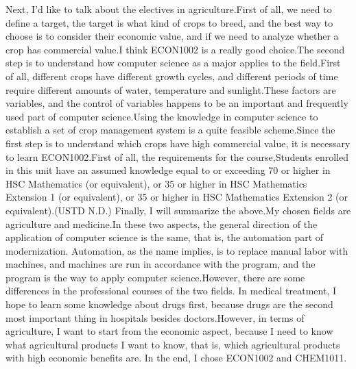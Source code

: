 \documentclass[12pt]{article}
\begin{document}
Next, I'd like to talk about the electives in agriculture.First of all, we need to define a target, the target is what kind of crops to breed, and the best way to choose is to consider their economic value, and if we need to analyze whether a crop has commercial value.I think ECON1002 is a really good choice.The second step is to understand how computer science as a major applies to the field.First of all, different crops have different growth cycles, and different periods of time require different amounts of water, temperature and sunlight.These factors are variables, and the control of variables happens to be an important and frequently used part of computer science.Using the knowledge in computer science to establish a set of crop management system is a quite feasible scheme.Since the first step is to understand which crops have high commercial value, it is necessary to learn ECON1002.First of all, the requirements for the course,Students enrolled in this unit have an assumed knowledge equal to or exceeding 70 or higher in HSC Mathematics (or equivalent), or 35 or higher in HSC Mathematics Extension 1 (or equivalent), or 35 or higher in HSC Mathematics Extension 2 (or equivalent).(USTD N.D.)
Finally, I will summarize the above.My chosen fields are agriculture and medicine.In these two aspects, the general direction of the application of computer science is the same, that is, the automation part of modernization. Automation, as the name implies, is to replace manual labor with machines, and machines are run in accordance with the program, and the program is the way to apply computer science.However, there are some differences in the professional courses of the two fields. In medical treatment, I hope to learn some knowledge about drugs first, because drugs are the second most important thing in hospitals besides doctors.However, in terms of agriculture, I want to start from the economic aspect, because I need to know what agricultural products I want to know, that is, which agricultural products with high economic benefits are. In the end, I chose ECON1002 and CHEM1011.
\end{document}
